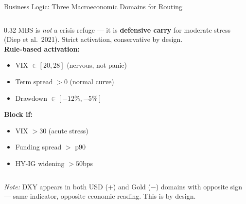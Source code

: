 \documentclass[aspectratio=169, 11pt]{beamer}
\begin{document}
\begin{frame}{Business Logic: Three Macroeconomic Domains for Routing}
\begin{columns}[T]
\begin{column}{0.32\textwidth}
  \footnotesize
  MBS is \textit{not} a crisis refuge --- it is \textbf{defensive carry} for moderate stress (Diep et al.\ 2021). Strict activation, conservative by design.\\[0.2cm]
  \textbf{Rule-based activation:}
  \begin{itemize}\setlength\itemsep{0.05cm}
    \item VIX $\in [20, 28]$ (nervous, not panic)
    \item Term spread $> 0$ (normal curve)
    \item Drawdown $\in [-12\%, -5\%]$
  \end{itemize}
  \textbf{Block if:}
  \begin{itemize}\setlength\itemsep{0.05cm}
    \item VIX $> 30$ (acute stress)
    \item Funding spread $>$ p90
    \item HY-IG widening $> 50$bps
  \end{itemize}
\end{column}
\end{columns}
\vspace{0.2cm}
\centering
\footnotesize\textit{Note:} DXY appears in both USD ($+$) and Gold ($-$) domains with opposite sign --- same indicator, opposite economic reading. This is by design.
\end{frame}
\end{document}
